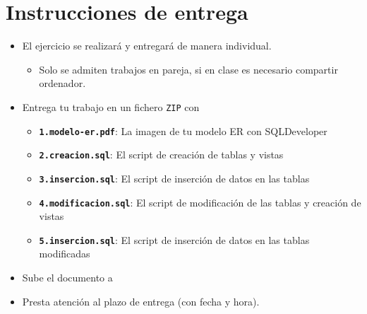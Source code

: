 \section{Instrucciones de entrega}
\begin{itemize}
\item El ejercicio se realizará y entregará de manera individual.
  \begin{itemize}
  \item Solo se admiten trabajos en pareja, si en clase es necesario compartir ordenador.
  \end{itemize}
\item Entrega tu trabajo en un fichero \texttt{ZIP} con
  \begin{itemize}
  \item \texttt{\textbf{1.modelo-er.pdf}}: La imagen de tu modelo ER  con SQLDeveloper
  \item \texttt{\textbf{2.creacion.sql}}: El script de creación de tablas y vistas
  \item \texttt{\textbf{3.insercion.sql}}: El script de inserción de datos en las tablas
  \item \texttt{\textbf{4.modificacion.sql}}: El script de modificación de las tablas y creación de vistas
  \item \texttt{\textbf{5.insercion.sql}}: El script de inserción de datos en las tablas modificadas
  \end{itemize}
\item Sube el documento a 
\item Presta atención al plazo de entrega (con fecha y hora).
  
\end{itemize}





